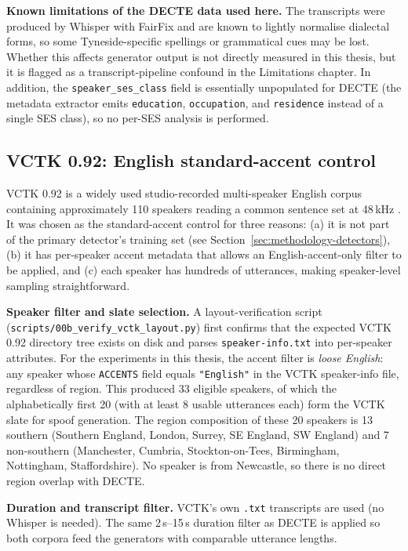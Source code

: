 \textbf{Known limitations of the DECTE data used here.} The
transcripts were produced by Whisper with FairFix and are known to
lightly normalise dialectal forms, so some Tyneside-specific
spellings or grammatical cues may be lost. Whether this affects
generator output is not directly measured in this thesis, but it is
flagged as a transcript-pipeline confound in the Limitations
chapter. In addition, the \texttt{speaker\_ses\_class} field is
essentially unpopulated for DECTE (the metadata extractor emits
\texttt{education}, \texttt{occupation}, and \texttt{residence}
instead of a single SES class), so no per-SES analysis is performed.

\subsection{VCTK 0.92: English standard-accent control}
\label{sec:methodology-corpora-vctk}

VCTK 0.92 is a widely used studio-recorded multi-speaker English
corpus containing approximately 110 speakers reading a common
sentence set at 48\,kHz \cite{Veaux2017_VCTK}. It was chosen as the
standard-accent control for three reasons: (a) it is not part of the
primary detector's training set (see
Section~\ref{sec:methodology-detectors}), (b) it has per-speaker
accent metadata that allows an English-accent-only filter to be
applied, and (c) each speaker has hundreds of utterances, making
speaker-level sampling straightforward.

\textbf{Speaker filter and slate selection.} A layout-verification
script (\texttt{scripts/}\allowbreak\texttt{00b\_verify\_vctk\_layout.py})
first confirms that the expected VCTK 0.92 directory tree exists on
disk and parses \texttt{speaker-info.txt} into per-speaker attributes.
For the experiments in this thesis, the accent filter is \emph{loose
English}: any speaker whose \texttt{ACCENTS} field equals
\texttt{"English"} in the VCTK speaker-info file, regardless of
region. This produced 33 eligible speakers, of which the
alphabetically first 20 (with at least 8 usable utterances each)
form the VCTK slate for spoof generation. The region composition of
these 20 speakers is 13 southern (Southern England, London, Surrey,
SE England, SW England) and 7 non-southern (Manchester, Cumbria,
Stockton-on-Tees, Birmingham, Nottingham, Staffordshire). No speaker
is from Newcastle, so there is no direct region overlap with DECTE.

\textbf{Duration and transcript filter.} VCTK's own \texttt{.txt}
transcripts are used (no Whisper is needed). The same 2\,s--15\,s
duration filter as DECTE is applied so both corpora feed the
generators with comparable utterance lengths.

